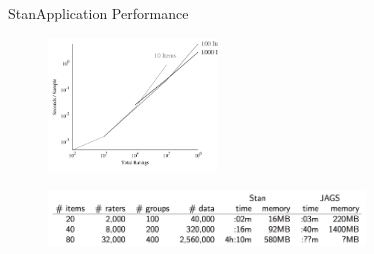 \documentclass[AERbeamer%
              ,optEnglish%
              ,optBiber%
              ,optBibstyleAlphabetic%
              ,optBeamerClassicFormat%
              ]{AERlatex}%
\begin{document}
\begin{frame}[c]{Stan}{Application Performance}
    \centering
    \begin{figure}
        \centering
        \includegraphics[width=0.4\textwidth]{STANSamplerperSecond.png}
    \end{figure}
    \begin{figure}
        \centering
        \includegraphics[width=0.75\textwidth]{STANImprovement.png}
    \end{figure}
\end{frame}
\end{document}
